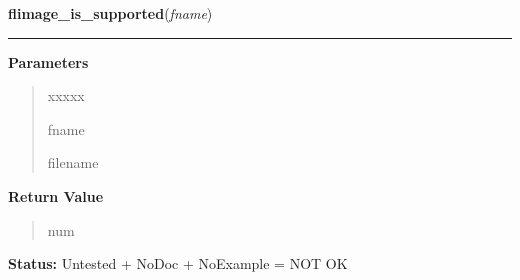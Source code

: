 \hspace{.8\funcindent}\begin{boxedminipage}{\funcwidth}

    \raggedright \textbf{flimage\_is\_supported}(\textit{fname})

    \vspace{-1.5ex}

    \rule{\textwidth}{0.5\fboxrule}
\setlength{\parskip}{2ex}
\setlength{\parskip}{1ex}
      \textbf{Parameters}
      \vspace{-1ex}

      \begin{quote}
        \begin{Ventry}{xxxxx}

          \item[fname]

          filename

        \end{Ventry}

      \end{quote}

      \textbf{Return Value}
    \vspace{-1ex}

      \begin{quote}
      num

      \end{quote}

\textbf{Status:} Untested + NoDoc + NoExample = NOT OK



    \end{boxedminipage}

    \label{xformslib:library:flimage_description_via_filter}

    \vspace{0.5ex}

